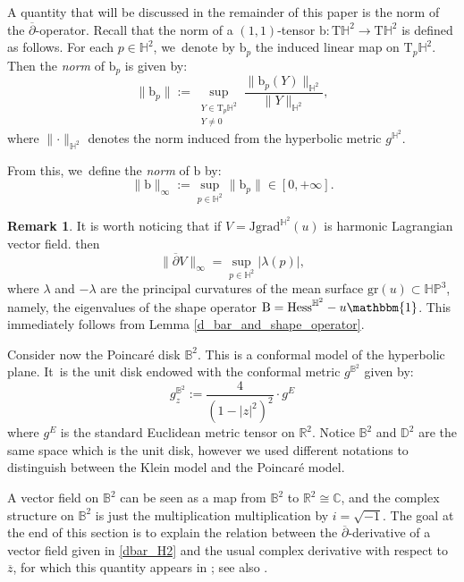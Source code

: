 \documentclass[10pt]{amsart}
\theoremstyle{plain}
\theoremstyle{definition}
\newtheorem{remark}[cor]{Remark}
\newcommand{\bb}{\mathrm{b}}
\newcommand{\HP}{\mathbb{HP}^3}
\newcommand{\grad}{\mathrm{grad}^{\mathbb{H}^2}}
\newcommand{\hess}{\mathrm{Hess}^{\mathbb{H}^2}}
\newcommand{\J}{\mathrm{J}}
\newcommand{\B}{\mathrm{B}}
\begin{document}
A quantity that will be discussed in the remainder of this paper is the norm of the $\overline{\partial}$-operator. Recall that the norm of a $(1,1)$-tensor $\bb: \mathrm{T}\mathbb{H}^2 \to \mathrm{T}\mathbb{H}^2$ is defined as follows. For each $p \in \mathbb{H}^2$, we~denote by $\bb_p$ the induced linear map on $\mathrm{T}_p\mathbb{H}^2$. Then the \emph{norm} of $\bb_p$ is given by:
\begin{equation}\label{norme}
\lVert \bb_p \rVert := \sup_{\substack{Y\in\mathrm{T}_p\mathbb{H}^2\\Y\neq 0}} \frac{\lVert \bb_p(Y) \rVert_{\mathbb{H}^2}}{\lVert Y \rVert_{\mathbb{H}^2}},
\end{equation}
where $\lVert \cdot \rVert_{\mathbb{H}^2}$ denotes the norm induced from the hyperbolic metric $g^{\mathbb{H}^2}$.

From this, we~define the \emph{norm} of $\bb$ by:
\[
\lVert \bb \rVert_{\infty} := \sup_{p \in \mathbb{H}^2} \lVert \bb_p \rVert \in [0, +\infty].
\]

\begin{remark}\label{principal_curvature}
It is worth noticing that if $V=\J\grad(u)$ is harmonic Lagrangian vector field. then
\[
\lVert \overline{\partial}V\rVert_{\infty}=\sup_{p\in\mathbb{H}^2}\lvert\lambda(p)\rvert,
\]
where $\lambda$ and $-\lambda$ are the principal curvatures of the mean surface $\mathrm{gr}(u)\subset\HP$, namely, the eigenvalues of the shape operator $\B=\hess-u\mathbbm{1}$. This immediately follows from Lemma \ref{d_bar_and_shape_operator}.
\end{remark}

Consider now the Poincaré disk $\mathbb{B}^2$. This is a conformal model of the hyperbolic plane. It~is the unit disk endowed with the conformal metric $g^{\mathbb{B}^2}$ given by:
\[
g^{\mathbb{B}^2}_{z}:=\frac{4}{(1-\lvert z\rvert^2)^2}\cdot g^{E}
\]
where $g^E$ is the standard Euclidean metric tensor on $\mathbb{R}^2$. Notice $\mathbb{B}^2$ and $\mathbb{D}^2$ are the same space which is the unit disk, however we used different notations to distinguish between the Klein model and the Poincaré model.

A vector field on $\mathbb{B}^2$ can be seen as a map from $\mathbb{B}^2$ to $\mathbb{R}^2\cong\mathbb{C}$, and the complex structure on $\mathbb{B}^2$ is just the multiplication multiplication by $i=\sqrt{-1}$. The goal at the end of this section is to explain the relation between the $\overline{\partial}$-derivative of a vector field given in \eqref{dbar_H2} and the usual complex derivative with respect to $\overline{z}$, for which this quantity appears in \cite{Extension_with_bounded_derivative}; see also \cite{FanJun}.
\end{document}
